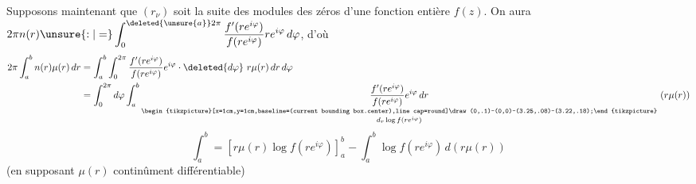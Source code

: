 Supposons maintenant que $(r_\nu)$ soit la suite des
modules des zéros d'une fonction entière $f(z)$.
On aura $\displaystyle 2\pi n(r)\unsure{:|=}\int_0^{\deleted{\unsure{a}}2\pi}\frac{f'(re^{i\varphi})}{f(re^{i\varphi})}re^{i\varphi}\,d\varphi$, d'où
\[
\begin{aligned}
2\pi\int_a^b n(r)\mu(r)\,dr
&=\int_a^b\int_0^{2\pi}\frac{f'(re^{i\varphi})}{f(re^{i\varphi})}e^{i\varphi}\cdot\deleted{d\varphi}\ r\mu(r)\,dr\,d\varphi\\
&=\int_0^{2\pi}d\varphi\int_a^b
\underset{d_r\log f(re^{i\varphi})}{\underset{\begin{tikzpicture}[x=1cm,y=1cm,baseline=(current bounding box.center),line cap=round]\draw (0,.1)--(0,0)--(3.25,.08)--(3.22,.18);\end{tikzpicture}}{\frac{f'(re^{i\varphi})}{f(re^{i\varphi})}e^{i\varphi}\,dr}}\ (r\mu(r))
\end{aligned}
\]
\[
\int_a^b=\left[r\mu(r)\log f(re^{i\varphi})\right]_a^b-\int_a^b\log f(re^{i\varphi})\,d(r\mu(r))
\]
(en supposant $\mu(r)$ continûment différentiable)

